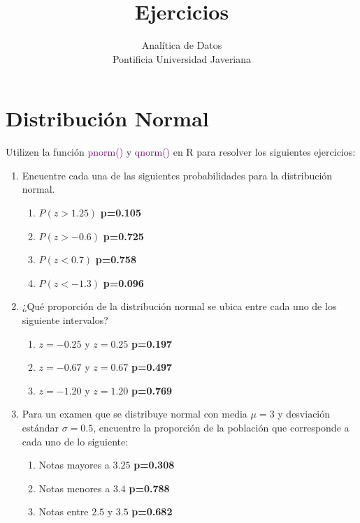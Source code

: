 \documentclass[letterpaper]{article}
\begin{document}
\title{{\bf Ejercicios}} 
\author{Analítica de Datos  \\
	Pontificia Universidad Javeriana}

\date{}

\maketitle


\section{Distribución Normal}

Utilizen la función \textcolor{purple}{pnorm()} y \textcolor{purple}{qnorm()} en R para resolver los siguientes ejercicios:


\begin{enumerate}
	\item Encuentre cada una de las siguientes probabilidades para la distribución normal.
	\begin{enumerate}
		\item $P(z>1.25)$ {\bf p=0.105}
		\item $P(z>-0.6)$ {\bf p=0.725}
		\item $P(z<0.7)$ {\bf p=0.758}
		\item $P(z<-1.3)$ {\bf p=0.096}
	\end{enumerate}
	
	\item ¿Qué proporción de la distribución normal se ubica entre cada uno de los siguiente intervalos?
	\begin{enumerate}
		\item $z= -0.25$ y $z=0.25$  {\bf p=0.197}
		\item $z=-0.67$ y $z=0.67$  {\bf p=0.497}
		\item $z= -1.20$ y $z=1.20$  {\bf p=0.769}
	\end{enumerate}
	
	\item Para un examen que se distribuye normal con media $\mu=3$ y desviación estándar $\sigma=0.5$, encuentre la proporción de la población que corresponde a cada uno de lo siguiente:
	\begin{enumerate}
		\item Notas mayores a $3.25$ {\bf p=0.308}
		\item Notas menores a $3.4$ {\bf p=0.788}
		\item Notas entre $2.5$ y $3.5$ {\bf p=0.682}
	\end{enumerate}
	

\end{enumerate}
\end{document}
